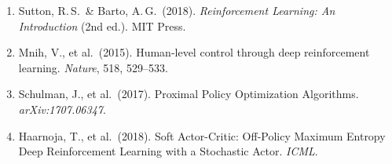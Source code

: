 \documentclass{article}
\begin{document}
\begin{enumerate}
  \item Sutton, R.\,S.\ \& Barto, A.\,G.\ (2018). \textit{Reinforcement Learning: An Introduction} (2nd ed.). MIT Press.
  \item Mnih, V., et al.\ (2015). Human-level control through deep reinforcement learning. \textit{Nature}, 518, 529--533.
  \item Schulman, J., et al.\ (2017). Proximal Policy Optimization Algorithms. \textit{arXiv:1707.06347}.
  \item Haarnoja, T., et al.\ (2018). Soft Actor-Critic: Off-Policy Maximum Entropy Deep Reinforcement Learning with a Stochastic Actor. \textit{ICML}.
\end{enumerate}
\end{document}
